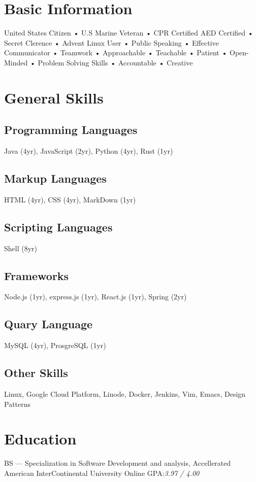\documentclass{resume-class/nadario_resume}
\begin{document}
\makecvtitle{}
\section{Basic Information}
\begin{center}
United States Citizen • U.S Marine Veteran • CPR Certified AED Certified • Secret
Clerence • Advent Linux User • Public Speaking • Effective Communicator •
Teamwork • Approachable • Teachable • Patient • Open-Minded • Problem Solving Skills • Accountable • Creative
\end{center}

\section{General Skills}
\subsection{Programming Languages}
Java (4yr), JavaScript (2yr), Python (4yr), Rust (1yr)
\subsection{Markup Languages}
HTML (4yr), CSS (4yr), MarkDown (1yr)
\subsection{Scripting Languages}
Shell (8yr)
\subsection{Frameworks}
Node.js (1yr), express.js (1yr), React.js (1yr), Spring (2yr)
\subsection{Quary Language}
MySQL (4yr), ProsgreSQL (1yr)
\subsection{Other Skills}
Linux, Google Cloud Platform, Linode, Docker, Jenkins, Vim, Emacs, Design
Patterns

\section{Education}
        {BS --- Specialization in Software Development and analysis, Accellerated}
        {American InterContinental University}
        {Online}
        {}{GPA:\textit{3.97 / 4.00}}
        \vspace{.25cm}
\end{document}
